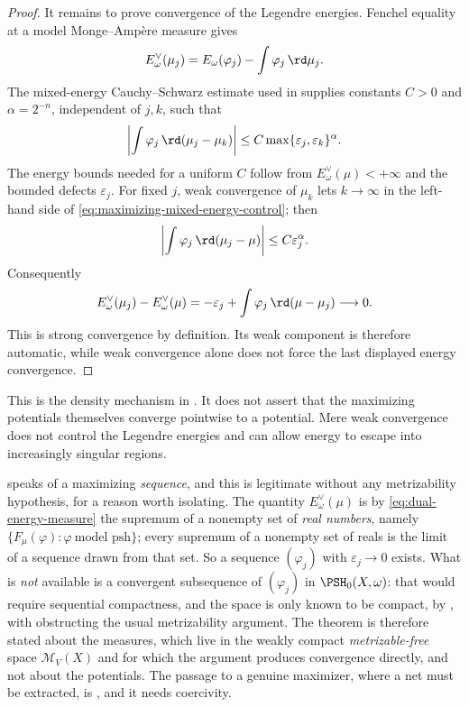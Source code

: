 \begin{proof}
It remains to prove convergence of the Legendre energies.  Fenchel equality
at a model Monge--Amp\`ere measure gives
\[
 E_\omega^\vee(\mu_j)
 =E_\omega(\varphi_j)-\int\varphi_j\,\rd\mu_j.
\]
The mixed-energy Cauchy--Schwarz estimate used in
 supplies constants
$C>0$ and $\alpha=2^{-n}$, independent of $j,k$, such that
\begin{equation}\label{eq:maximizing-mixed-energy-control}
 \left|\int\varphi_j\,\rd(\mu_j-\mu_k)\right|
 \leq C\max\{\varepsilon_j,\varepsilon_k\}^{\alpha}.
\end{equation}
The energy bounds needed for a uniform $C$ follow from
$E_\omega^\vee(\mu)<+\infty$ and the bounded defects
$\varepsilon_j$.  For fixed $j$, weak convergence of $\mu_k$ lets
$k\to\infty$ in the left-hand side of
\eqref{eq:maximizing-mixed-energy-control}; then
\[
 \left|\int\varphi_j\,\rd(\mu_j-\mu)\right|
 \leq C\varepsilon_j^\alpha.
\]
Consequently
\[
 E_\omega^\vee(\mu_j)-E_\omega^\vee(\mu)
 =-\varepsilon_j+
   \int\varphi_j\,\rd(\mu-\mu_j)\longrightarrow0.
\]
This is strong convergence by definition.  Its weak component is therefore
automatic, while weak convergence alone does not force the last displayed
energy convergence.
\end{proof}

This is the density mechanism in
.  It does not assert that
the maximizing potentials themselves converge pointwise to a potential.
Mere weak convergence does not control the Legendre energies and can allow
energy to escape into increasingly singular regions.

\begin{remark}
\label{rem:ch28-maximizing-sequence-exists}
 speaks of a maximizing
\emph{sequence}, and this is legitimate without any metrizability
hypothesis, for a reason worth isolating.  The quantity
$E^\vee_\omega(\mu)$ is by \eqref{eq:dual-energy-measure} the supremum of a
nonempty set of \emph{real numbers}, namely
$\{F_\mu(\varphi):\varphi\ \text{model psh}\}$; every supremum of a
nonempty set of reals is the limit of a sequence drawn from that set.  So a
sequence $(\varphi_j)$ with $\varepsilon_j\to0$ exists.  What is
\emph{not} available is a convergent subsequence of $(\varphi_j)$ in
$\PSH_0(X,\omega)$: that would require sequential compactness, and the
space is only known to be compact, by , with
 obstructing the usual metrizability
argument.  The theorem is therefore stated about the measures, which live in
the weakly compact \emph{metrizable-free} space $\mathcal M_V(X)$ and for
which the argument produces convergence directly, and not about the
potentials.  The passage to a genuine maximizer, where a net must be
extracted, is , and it needs coercivity.
\end{remark}

